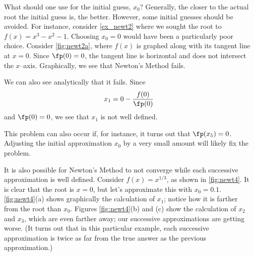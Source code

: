 What should one use for the initial guess, $x_0$?  Generally, the closer to the actual root the initial guess is, the better.  However, some initial guesses should be avoided.  For instance, consider \autoref{ex_newt2} where we sought the root to $f(x) = x^3-x^2-1$.  Choosing  $x_0=0$ would have been a particularly poor choice. Consider \autoref{fig:newt2a}, where $f(x)$ is graphed along with its tangent line at $x=0$. Since $\fp(0)=0$, the tangent line is horizontal and does not intersect the $x$--axis. Graphically, we see that Newton's Method fails.

We can also see analytically that it fails. Since
\[x_1 = 0 -\frac{f(0)}{\fp(0)}\]
and $\fp(0)=0$, we see that $x_1$ is not well defined.  

This problem can also occur if, for instance, it turns out that $\fp(x_5)=0$. Adjusting the initial approximation $x_0$ by a very small amount will likely fix the problem.

It is also possible for Newton's Method to not converge while each successive approximation is well defined. Consider $f(x) = x^{1/3}$, as shown in \autoref{fig:newt4}. It is clear that the root is $x=0$, but let's approximate this with $x_0=0.1$. \autoref{fig:newt4}(a) shows graphically the calculation of $x_1$; notice how it is farther from the root than $x_0$. Figures \ref{fig:newt4}(b) and (c) show the calculation of $x_2$ and $x_3$, which are even farther away; our successive approximations are getting worse. (It turns out that in this particular example, each successive approximation is twice as far from the true answer as the previous approximation.)

